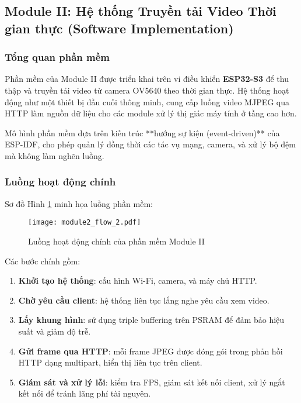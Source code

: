 \subsection{Module II: Hệ thống Truyền tải Video Thời gian thực (Software Implementation)}
\label{sec:module_ii_software}

\subsubsection{Tổng quan phần mềm}
Phần mềm của Module II được triển khai trên vi điều khiển \textbf{ESP32-S3} để thu thập và truyền tải video từ camera OV5640 theo thời gian thực. Hệ thống hoạt động như một thiết bị đầu cuối thông minh, cung cấp luồng video MJPEG qua HTTP làm nguồn dữ liệu cho các module xử lý thị giác máy tính ở tầng cao hơn.  

Mô hình phần mềm dựa trên kiến trúc **hướng sự kiện (event-driven)** của ESP-IDF, cho phép quản lý đồng thời các tác vụ mạng, camera, và xử lý bộ đệm mà không làm nghẽn luồng.

\subsubsection{Luồng hoạt động chính}
Sơ đồ Hình \ref{fig:sw_architecture_flow} minh họa luồng phần mềm:

\begin{figure}[H]
    \centering
    \texttt{[image: module2\_flow\_2.pdf]}
    \caption{Luồng hoạt động chính của phần mềm Module II}
    \label{fig:sw_architecture_flow}
\end{figure}

Các bước chính gồm:

\begin{enumerate}
    \item \textbf{Khởi tạo hệ thống}: cấu hình Wi-Fi, camera, và máy chủ HTTP.
    \item \textbf{Chờ yêu cầu client}: hệ thống liên tục lắng nghe yêu cầu xem video.
    \item \textbf{Lấy khung hình}: sử dụng triple buffering trên PSRAM để đảm bảo hiệu suất và giảm độ trễ.
    \item \textbf{Gửi frame qua HTTP}: mỗi frame JPEG được đóng gói trong phản hồi HTTP dạng multipart, hiển thị liên tục trên client.
    \item \textbf{Giám sát và xử lý lỗi}: kiểm tra FPS, giám sát kết nối client, xử lý ngắt kết nối để tránh lãng phí tài nguyên.
\end{enumerate}

